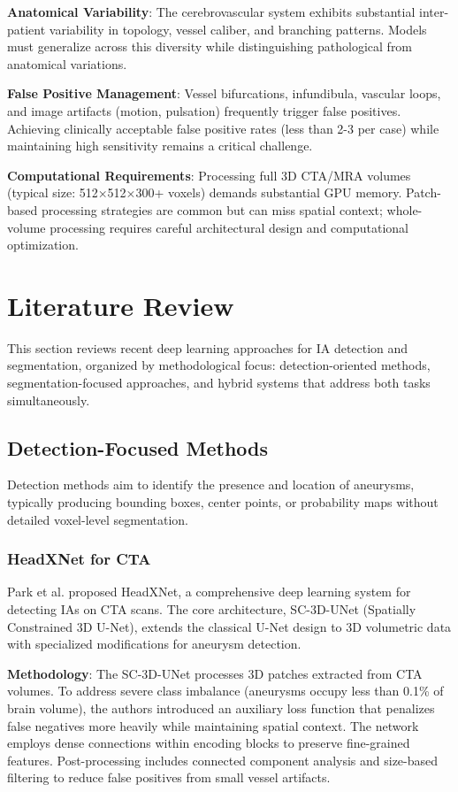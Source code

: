 \documentclass[conference]{IEEEtran}
\begin{document}
\textbf{Anatomical Variability}: The cerebrovascular system exhibits substantial inter-patient variability in topology, vessel caliber, and branching patterns. Models must generalize across this diversity while distinguishing pathological from anatomical variations.

\textbf{False Positive Management}: Vessel bifurcations, infundibula, vascular loops, and image artifacts (motion, pulsation) frequently trigger false positives. Achieving clinically acceptable false positive rates (less than 2-3 per case) while maintaining high sensitivity remains a critical challenge.

\textbf{Computational Requirements}: Processing full 3D CTA/MRA volumes (typical size: 512×512×300+ voxels) demands substantial GPU memory. Patch-based processing strategies are common but can miss spatial context; whole-volume processing requires careful architectural design and computational optimization.

\section{Literature Review}

This section reviews recent deep learning approaches for IA detection and segmentation, organized by methodological focus: detection-oriented methods, segmentation-focused approaches, and hybrid systems that address both tasks simultaneously.

\subsection{Detection-Focused Methods}

Detection methods aim to identify the presence and location of aneurysms, typically producing bounding boxes, center points, or probability maps without detailed voxel-level segmentation.

\subsubsection{HeadXNet for CTA}
Park et al. \cite{park2019headxnet} proposed HeadXNet, a comprehensive deep learning system for detecting IAs on CTA scans. The core architecture, SC-3D-UNet (Spatially Constrained 3D U-Net), extends the classical U-Net design to 3D volumetric data with specialized modifications for aneurysm detection.

\textbf{Methodology}: The SC-3D-UNet processes 3D patches extracted from CTA volumes. To address severe class imbalance (aneurysms occupy less than 0.1\% of brain volume), the authors introduced an auxiliary loss function that penalizes false negatives more heavily while maintaining spatial context. The network employs dense connections within encoding blocks to preserve fine-grained features. Post-processing includes connected component analysis and size-based filtering to reduce false positives from small vessel artifacts.
\end{document}

